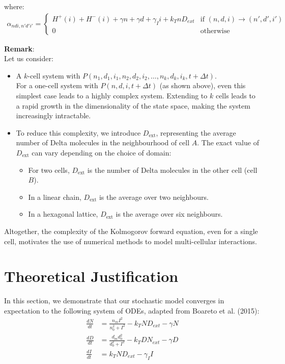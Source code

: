 \documentclass{article}
\begin{document}
\begin{flushleft}
where:
\begin{align*}
\alpha_{ndi,n'd'i'} = 
\begin{cases}
H^+(i) + H^-(i) + \gamma n + \gamma d + \gamma_I i + k_T n D_{ext} & \text{if } (n,d,i) \rightarrow (n',d',i') \\
0 & \text{otherwise}
\end{cases}
\end{align*}

\textbf{Remark}:\\
Let us consider:

\begin{itemize}
    
    \item A $k$-cell system with $P(n_1,d_1,i_1,n_2,d_2,i_2,\dots,n_k,d_k,i_k,t+\Delta t)$.\\
    For a one-cell system with $P(n,d,i,t+\Delta t)$ (as shown above), even this simplest case leads to a highly complex system. Extending to $k$ cells leads to a rapid growth in the dimensionality of the state space, making the system increasingly intractable.
    
    \item To reduce this complexity, we introduce $D_{\text{ext}}$, representing the average number of Delta molecules in the neighbourhood of cell $A$. The exact value of $D_{\text{ext}}$ can vary depending on the choice of domain:
    \begin{itemize}
        \item For two cells, $D_{\text{ext}}$ is the number of Delta molecules in the other cell (cell $B$).
        \item In a linear chain, $D_{\text{ext}}$ is the average over two neighbours.
        \item In a hexagonal lattice, $D_{\text{ext}}$ is the average over six neighbours.
    \end{itemize}
\end{itemize}

Altogether, the complexity of the Kolmogorov forward equation, even for a single cell, motivates the use of numerical methods to model multi-cellular interactions.


\section{Theoretical Justification}
\label{sec:theoretical-justification}

In this section, we demonstrate that our stochastic model converges in expectation to the following system of ODEs, adapted from Boareto et al. (2015):
$$
\begin{aligned}
  \frac{dN}{dt} &= \frac{n_{m}I^2}{n_{0}^2 + I^2} - k_{T}ND_{ext} - \gamma N \\[5pt]
  \frac{dD}{dt} &= \frac{d_{m}d_{0}^2}{d_{0}^2 + I^2} - k_{T}DN_{ext} - \gamma D \\[5pt]
  \frac{dI}{dt} &= k_{T}ND_{ext} - \gamma_{I}I
\end{aligned}
$$


\end{flushleft}
\end{document}
